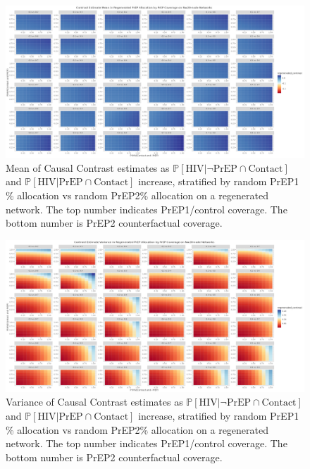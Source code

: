 \documentclass{article}
\theoremstyle{definition}
\begin{document}
\begin{figure}[H]
    \centering
    \includegraphics[width=\linewidth]{Corrected Figures/PrEP Regenerated Mean Plots.png}
    \caption{Mean of Causal Contrast estimates as $\mathbb{P}\left[\text{HIV} \vert \neg \text{PrEP} \cap \text{Contact}\right]$ and $\mathbb{P}\left[\text{HIV} \vert \text{PrEP} \cap \text{Contact}\right]$ increase, stratified by  random PrEP1 \% allocation vs random PrEP2\% allocation on a regenerated network. The top number indicates PrEP1/control coverage. The bottom number is PrEP2 counterfactual coverage.}
    \label{fig:Figure S4.15}
\end{figure}
\begin{figure}[H]
    \centering
    \includegraphics[width=\linewidth]{Corrected Figures/PrEP Regenerated Variance Plots.png}
    \caption{Variance of Causal Contrast estimates as $\mathbb{P}\left[\text{HIV} \vert \neg \text{PrEP} \cap \text{Contact}\right]$ and $\mathbb{P}\left[\text{HIV} \vert \text{PrEP} \cap \text{Contact}\right]$ increase, stratified by random PrEP1 \% allocation vs random PrEP2\% allocation on a regenerated network. The top number indicates PrEP1/control coverage. The bottom number is PrEP2 counterfactual coverage. }
    \label{fig:Figure S4.16}
\end{figure}
\end{document}
